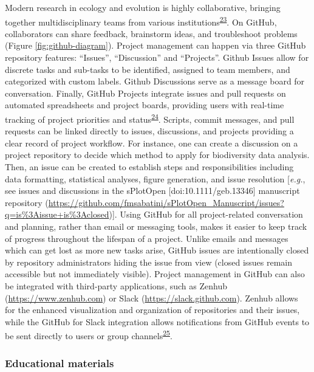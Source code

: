 Modern research in ecology and evolution is highly collaborative, bringing together multidisciplinary teams from various institutions\textsuperscript{\protect\hyperlink{ref-1HhzKAC1K}{23}}.
On GitHub, collaborators can share feedback, brainstorm ideas, and troubleshoot problems (Figure \ref{fig:github-diagram}).
Project management can happen via three GitHub repository features: ``Issues'', ``Discussion'' and ``Projects''.
Github Issues allow for discrete tasks and sub-tasks to be identified, assigned to team members, and categorized with custom labels.
Github Discussions serve as a message board for conversation.
Finally, GitHub Projects integrate issues and pull requests on automated spreadsheets and project boards, providing users with real-time tracking of project priorities and status\textsuperscript{\protect\hyperlink{ref-RhBKe0MG}{24}}.
Scripts, commit messages, and pull requests can be linked directly to issues, discussions, and projects providing a clear record of project workflow.
For instance, one can create a discussion on a project repository to decide which method to apply for biodiversity data analysis.
Then, an issue can be created to establish steps and responsibilities including data formatting, statistical analyses, figure generation, and issue resolution {[}\emph{e.g.}, see issues and discussions in the sPlotOpen {[}doi:10.1111/geb.13346{]} manuscript repository (\url{https://github.com/fmsabatini/sPlotOpen_Manuscript/issues?q=is\%3Aissue+is\%3Aclosed}){]}.
Using GitHub for all project-related conversation and planning, rather than email or messaging tools, makes it easier to keep track of progress throughout the lifespan of a project.
Unlike emails and messages which can get lost as more new tasks arise, GitHub issues are intentionally closed by repository administrators hiding the issue from view (closed issues remain accessible but not immediately visible).
Project management in GitHub can also be integrated with third-party applications, such as Zenhub (\url{https://www.zenhub.com}) or Slack (\url{https://slack.github.com}).
Zenhub allows for the enhanced visualization and organization of repositories and their issues, while the GitHub for Slack integration allows notifications from GitHub events to be sent directly to users or group channels\textsuperscript{\protect\hyperlink{ref-1GRWGlDWy}{25}}.

\hypertarget{educational-materials}{%
\subsubsection{Educational materials}\label{educational-materials}}

